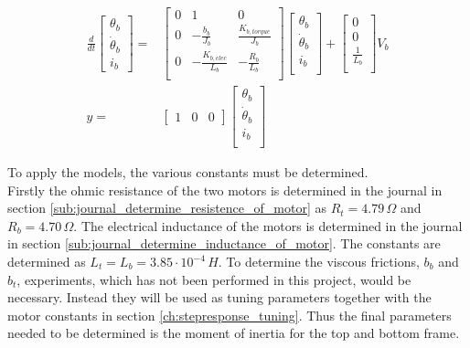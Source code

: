 \documentclass[../../main]{subfiles}
\begin{document}
\begin{equation}
      \label{eq:ss_bottomframe_Genereal_model}
      \begin{split}
      \frac{d}{dt}
    \begin{bmatrix}
        \theta_b \\
        \dot \theta_b \\
        i_b
    \end{bmatrix}
    =&
    \begin{bmatrix}
        0 & 1               & 0             \\
        0 & -\frac{b_b}{J_b}    & \frac{K_{b,torque}}{J_b} \\
        0 & -\frac{K_{b,elec}}{L_b}  & -\frac{R_b}{L_b}  \\
    \end{bmatrix}
    \begin{bmatrix}
        \theta_b \\
        \dot \theta_b \\
        i_b \\
    \end{bmatrix}
    +
    \begin{bmatrix}
        0 \\
        0 \\
        \frac{1}{L_b} \\
    \end{bmatrix}
    V_b
\\
      y =&
    \begin{bmatrix}
        1 & 0 & 0
    \end{bmatrix}
    \begin{bmatrix}
        \theta_b \\
        \dot \theta_b\\
        i_b\\
    \end{bmatrix}
  \end{split}
\end{equation}


To apply the models, the various constants must be determined.  \\
Firstly the ohmic resistance of the two motors is determined in the journal in section \ref{sub:journal_determine_resistence_of_motor} as $R_t = 4.79 \si{\,\Omega}$ and $R_b = 4.70 \si{\,\Omega}$. The electrical inductance of the motors is determined in the journal in section \ref{sub:journal_determine_inductance_of_motor}. The constants are determined as $L_t = L_b = 3.85\cdot 10^{-4} \si{\,H}$.
To determine the viscous frictions, $b_b$ and $b_t$, experiments, which has not been performed in this project, would be necessary. Instead they will be used as tuning parameters together with the motor constants in section \ref{ch:stepresponse_tuning}. Thus the final parameters needed to be determined is the moment of inertia for the top and bottom frame.
\end{document}

